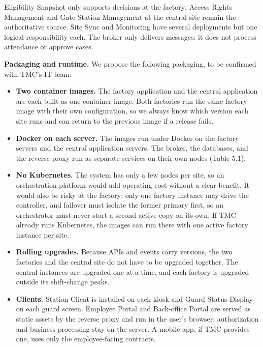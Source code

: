 Eligibility Snapshot only supports decisions at the factory; Access Rights Management and Gate Station Management at the central site remain the authoritative source. Site Sync and Monitoring have several deployments but one logical responsibility each. The broker only delivers messages: it does not process attendance or approve cases.

\textbf{Packaging and runtime.} We propose the following packaging, to be confirmed with TMC's IT team:

\begin{itemize}[leftmargin=36pt, itemsep=2pt, topsep=4pt, parsep=2pt]
  \item \textbf{Two container images.} The factory application and the central application are each built as one container image. Both factories run the same factory image with their own configuration, so we always know which version each site runs and can return to the previous image if a release fails.
  \item \textbf{Docker on each server.} The images run under Docker on the factory servers and the central application servers. The broker, the databases, and the reverse proxy run as separate services on their own nodes (Table 5.1).
  \item \textbf{No Kubernetes.} The system has only a few nodes per site, so an orchestration platform would add operating cost without a clear benefit. It would also be risky at the factory: only one factory instance may drive the controller, and failover must isolate the former primary first, so an orchestrator must never start a second active copy on its own. If TMC already runs Kubernetes, the images can run there with one active factory instance per site.
  \item \textbf{Rolling upgrades.} Because APIs and events carry versions, the two factories and the central site do not have to be upgraded together. The central instances are upgraded one at a time, and each factory is upgraded outside its shift-change peaks.
  \item \textbf{Clients.} Station Client is installed on each kiosk and Guard Status Display on each guard screen. Employee Portal and Back-office Portal are served as static assets by the reverse proxy and run in the user's browser; authorization and business processing stay on the server. A mobile app, if TMC provides one, uses only the employee-facing contracts.
\end{itemize}

